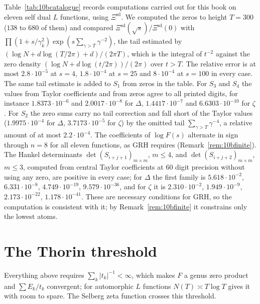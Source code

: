 Table~\ref{tab:10bcatalogue} records computations carried out for this book on eleven self dual $L$ functions, using $\Xi^{\mathrm{sd}}$. We computed the zeros to height $T = 300$ ($138$ to $680$ of them) and compared $\Xi^{\mathrm{sd}}(\sqrt s)/\Xi^{\mathrm{sd}}(0)$ with $\prod(1+s/\gamma_k^2)\exp(s\sum_{\gamma>T}\gamma^{-2})$, the tail estimated by $(\log N+d\log(T/2\pi)+d)/(2\pi T)$, which is the integral of $t^{-2}$ against the zero density $(\log N+d\log(t/2\pi))/(2\pi)$ over $t>T$. The relative error is at most $2.8\cdot10^{-5}$ at $s=4$, $1.8\cdot10^{-4}$ at $s=25$ and $8\cdot10^{-4}$ at $s=100$ in every case. The same tail estimate is added to $S_1$ from zeros in the table. For $S_3$ and $S_4$ the values from Taylor coefficients and from zeros agree to all printed digits, for instance $1.8373\cdot10^{-6}$ and $2.0017\cdot10^{-8}$ for $\Delta$, $1.4417\cdot10^{-7}$ and $6.6303\cdot10^{-10}$ for $\zeta$. For $S_2$ the zero sums carry no tail correction and fall short of the Taylor values ($1.9975\cdot10^{-4}$ for $\Delta$, $3.7173\cdot10^{-5}$ for $\zeta$) by the omitted tail $\sum_{\gamma>T}\gamma^{-4}$, a relative amount of at most $2.2\cdot10^{-4}$. The coefficients of $\log F(s)$ alternate in sign through $n=8$ for all eleven functions, as GRH requires (Remark~\ref{rem:10bfinite}). The Hankel determinants $\det(S_{i+j+1})_{m\times m}$, $m\le4$, and $\det(S_{i+j+2})_{m\times m}$, $m\le3$, computed from central Taylor coefficients at $60$ digit precision without using any zero, are positive in every case; for $\Delta$ the first family is $5.618\cdot10^{-2}$, $6.331\cdot10^{-8}$, $4.749\cdot10^{-19}$, $9.579\cdot10^{-36}$, and for $\zeta$ it is $2.310\cdot10^{-2}$, $1.949\cdot10^{-9}$, $2.173\cdot10^{-22}$, $1.178\cdot10^{-41}$. These are necessary conditions for GRH, so the computation is consistent with it; by Remark~\ref{rem:10bfinite} it constrains only the lowest atoms.

\section{The Thorin threshold}

Everything above requires $\sum_k|t_k|^{-1}<\infty$, which makes $F$ a genus zero product and $\sum E_k/t_k$ convergent; for automorphic $L$ functions $N(T)\asymp T\log T$ gives it with room to spare. The Selberg zeta function crosses this threshold.

